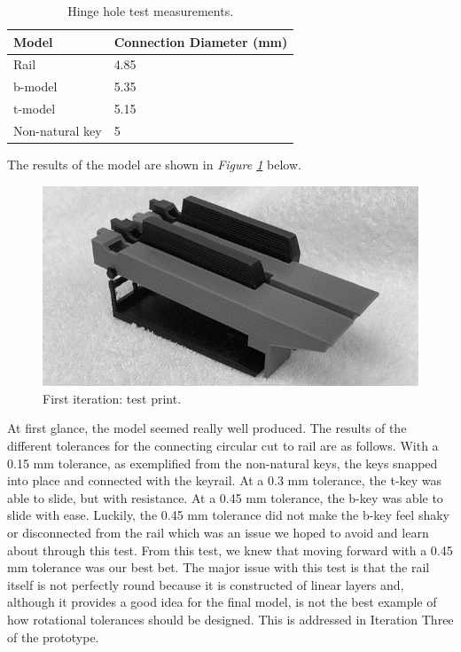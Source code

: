 \begin{table}[]
  \centering
  \begin{tabular}{|l|l|}
    \hline
    Model           & Connection Diameter (mm) \\ \hline
    Rail            & 4.85                     \\ \hline
    b-model         & 5.35                     \\ \hline
    t-model         & 5.15                     \\ \hline
    Non-natural key & 5                        \\ \hline
  \end{tabular}
  \caption{Hinge hole test measurements.}
  \label{Tab:connections}
\end{table}

The results of the model are shown in \textit{Figure \ref{fig:print1}} below.

\begin{figure}[h!]
  \centering
  \includegraphics[width=0.8\linewidth]{image/Print1.png}
  \caption{First iteration: test print.}
  \label{fig:print1}
\end{figure}

At first glance, the model seemed really well produced. The results of the different tolerances for the connecting circular cut to rail are as follows. With a 0.15 mm tolerance, as exemplified from the non-natural keys, the keys snapped into place and connected with the keyrail. At a 0.3 mm tolerance, the t-key was able to slide, but with resistance. At a 0.45 mm tolerance, the b-key was able to slide with ease. Luckily, the 0.45 mm tolerance did not make the b-key feel shaky or disconnected from the rail which was an issue we hoped to avoid and learn about through this test. From this test, we knew that moving forward with a 0.45 mm tolerance was our best bet. The major issue with this test is that the rail itself is not perfectly round because it is constructed of linear layers and, although it provides a good idea for the final model, is not the best example of how rotational tolerances should be designed. This is addressed in Iteration Three of the prototype.

